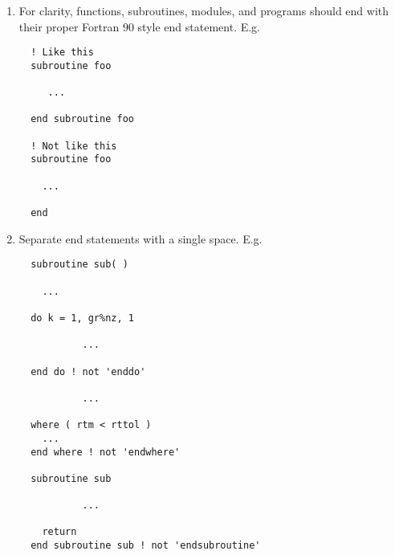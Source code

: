 \documentclass[letterpaper,12pt]{article}
\begin{document}
\begin{enumerate}
%
%

\item For clarity, functions, subroutines, modules, and programs should end 
with their proper Fortran 90 style end statement. \newline
E.g.
\begin{verbatim}
  ! Like this
  subroutine foo

     ...

  end subroutine foo

  ! Not like this
  subroutine foo

    ...

  end
\end{verbatim}

\item Separate end statements with a single space. \newline 
E.g.
\begin{verbatim}
  subroutine sub( )

    ...

  do k = 1, gr%nz, 1

           ...

  end do ! not 'enddo'

           ...

  where ( rtm < rttol )
    ...
  end where ! not 'endwhere'

  subroutine sub

           ...

    return
  end subroutine sub ! not 'endsubroutine'
\end{verbatim}



\end{enumerate}
\end{document}
